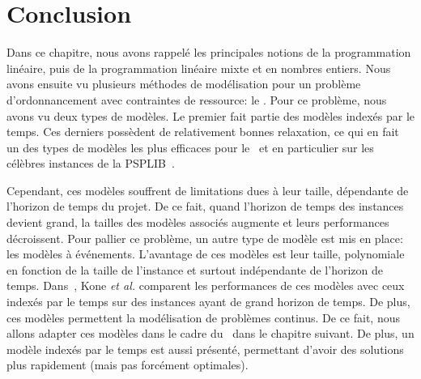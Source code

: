 \section*{Conclusion}

Dans ce chapitre, nous avons rappelé les principales notions de la
programmation linéaire, puis de la programmation linéaire mixte et en
nombres entiers. Nous avons ensuite vu plusieurs méthodes de
modélisation pour un problème d'ordonnancement avec contraintes de
ressource: le \RCPSP. Pour ce problème, nous avons vu deux types de
modèles. Le premier fait partie des modèles indexés par le temps. Ces
derniers possèdent de relativement bonnes relaxation, ce qui en fait
un des types de modèles les plus efficaces pour le \RCPSP~et en
particulier sur les célèbres instances de la PSPLIB~\cite{PSPLIB}. 

Cependant, ces modèles souffrent de limitations dues à leur taille,
dépendante de l'horizon de temps du projet. De ce fait, quand
l'horizon de temps des instances devient grand, la tailles des modèles
associés augmente et leurs performances décroissent. Pour pallier ce
problème, un autre type de modèle est mis en place: les modèles à
événements. L'avantage de ces modèles est leur taille, polynomiale en
fonction de la taille de l'instance et surtout indépendante de
l'horizon de temps. Dans~\cite{modele_RCPSP}, Kone {\it et al.}
comparent les performances de ces modèles avec ceux indexés par le
temps sur des instances ayant de grand horizon de temps. De plus, ces
modèles permettent la modélisation de problèmes continus. De ce fait,
nous allons adapter ces modèles dans le cadre du \CECSP~dans le
chapitre suivant. De plus, un modèle indexés par le temps est aussi
présenté, permettant d'avoir des solutions plus rapidement (mais pas
forcément optimales).